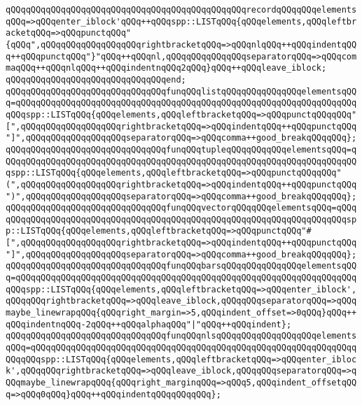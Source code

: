 \verb|qQQqqQQqqQQqqQQqqQQqqQQqqQQqqQQqqQQqqQQqqQQqqQQqrecordqQQqqQQqelementsqQQq=>qQQqenter_iblock'qQQq++qQQqspp::LISTqQQq{qQQqelements,qQQqleftbracketqQQq=>qQQqpunctqQQq"{qQQq",qQQqqQQqqQQqqQQqqQQqrightbracketqQQq=>qQQqnlqQQq++qQQqindentqQQq++qQQqpunctqQQq"}"qQQq++qQQqnl,qQQqqQQqqQQqqQQqseparatorqQQq=>qQQqcommaqQQq++qQQqnlqQQq++qQQqindentnqQQq2qQQq}qQQq++qQQqleave_iblock;|\newline
\verb|qQQqqQQqqQQqqQQqqQQqqQQqqQQqqQQqend;|\newline
\newline
\verb|qQQqqQQqqQQqqQQqqQQqqQQqqQQqqQQqfunqQQqlistqQQqqQQqqQQqqQQqelementsqQQq=qQQqqQQqqQQqqQQqqQQqqQQqqQQqqQQqqQQqqQQqqQQqqQQqqQQqqQQqqQQqqQQqqQQqqQQqspp::LISTqQQq{qQQqelements,qQQqleftbracketqQQq=>qQQqpunctqQQqqQQq"[",qQQqqQQqqQQqqQQqqQQqrightbracketqQQq=>qQQqindentqQQq++qQQqpunctqQQq"]",qQQqqQQqqQQqqQQqqQQqseparatorqQQq=>qQQqcomma++good_breakqQQqqQQq};|\newline
\verb|qQQqqQQqqQQqqQQqqQQqqQQqqQQqqQQqfunqQQqtupleqQQqqQQqqQQqelementsqQQq=qQQqqQQqqQQqqQQqqQQqqQQqqQQqqQQqqQQqqQQqqQQqqQQqqQQqqQQqqQQqqQQqqQQqqQQqspp::LISTqQQq{qQQqelements,qQQqleftbracketqQQq=>qQQqpunctqQQqqQQq"(",qQQqqQQqqQQqqQQqqQQqrightbracketqQQq=>qQQqindentqQQq++qQQqpunctqQQq")",qQQqqQQqqQQqqQQqqQQqseparatorqQQq=>qQQqcomma++good_breakqQQqqQQq};|\newline
\verb|qQQqqQQqqQQqqQQqqQQqqQQqqQQqqQQqfunqQQqvectorqQQqqQQqelementsqQQq=qQQqqQQqqQQqqQQqqQQqqQQqqQQqqQQqqQQqqQQqqQQqqQQqqQQqqQQqqQQqqQQqqQQqqQQqspp::LISTqQQq{qQQqelements,qQQqleftbracketqQQq=>qQQqpunctqQQq"#[",qQQqqQQqqQQqqQQqqQQqrightbracketqQQq=>qQQqindentqQQq++qQQqpunctqQQq"]",qQQqqQQqqQQqqQQqqQQqseparatorqQQq=>qQQqcomma++good_breakqQQqqQQq};|\newline
\verb|qQQqqQQqqQQqqQQqqQQqqQQqqQQqqQQqfunqQQqbarsqQQqqQQqqQQqqQQqelementsqQQq=qQQqqQQqqQQqqQQqqQQqqQQqqQQqqQQqqQQqqQQqqQQqqQQqqQQqqQQqqQQqqQQqqQQqqQQqspp::LISTqQQq{qQQqelements,qQQqleftbracketqQQq=>qQQqenter_iblock',qQQqqQQqrightbracketqQQq=>qQQqleave_iblock,qQQqqQQqseparatorqQQq=>qQQqmaybe_linewrapqQQq{qQQqright_margin=>5,qQQqindent_offset=>0qQQq}qQQq++qQQqindentnqQQq-2qQQq++qQQqalphaqQQq"|\verb#|"qQQq++qQQqindent};#\newline
\verb|qQQqqQQqqQQqqQQqqQQqqQQqqQQqqQQqfunqQQqnlsqQQqqQQqqQQqqQQqqQQqelementsqQQq=qQQqqQQqqQQqqQQqqQQqqQQqqQQqqQQqqQQqqQQqqQQqqQQqqQQqqQQqqQQqqQQqqQQqqQQqspp::LISTqQQq{qQQqelements,qQQqleftbracketqQQq=>qQQqenter_iblock',qQQqqQQqrightbracketqQQq=>qQQqleave_iblock,qQQqqQQqseparatorqQQq=>qQQqmaybe_linewrapqQQq{qQQqright_marginqQQq=>qQQq5,qQQqindent_offsetqQQq=>qQQq0qQQq}qQQq++qQQqindentqQQqqQQqqQQq};|\newline
